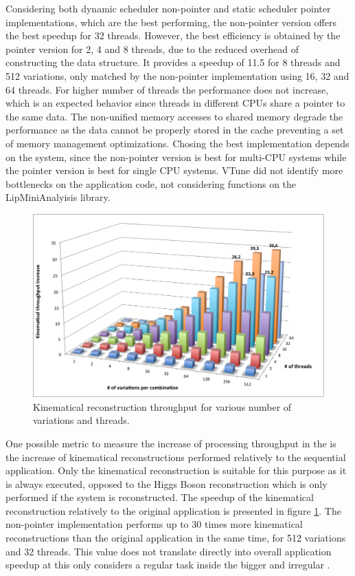 Considering both dynamic scheduler non-pointer and static scheduler pointer implementations, which are the best performing, the non-pointer version offers the best speedup for 32 threads. However, the best efficiency is obtained by the pointer version for 2, 4 and 8 threads, due to the reduced overhead of constructing the data structure. It provides a speedup of 11.5 for 8 threads and 512 variations, only matched by the non-pointer implementation using 16, 32 and 64 threads. For higher number of threads the performance does not increase, which is an expected behavior since threads in different CPUs share a pointer to the same data. The non-unified memory accesses to shared memory degrade the performance as the data cannot be properly stored in the cache preventing a set of memory management optimizations. Chosing the best implementation depends on the system, since the non-pointer version is best for multi-CPU systems while the pointer version is best for single CPU systems. VTune did not identify more bottlenecks on the application code, not considering functions on the LipMiniAnalyisis library.

\begin{figure}[!htp]
	\begin{center}
		\includegraphics[scale=0.6]{../../common/graphs/dilep_throughput.png}
		\caption{Kinematical reconstruction throughput for various number of variations and threads.}
		\label{fig:DilepThroughput}
	\end{center}
\end{figure}

One possible metric to measure the increase of processing throughput in the \ttDilepKinFit is the increase of kinematical reconstructions performed relatively to the sequential application. Only the kinematical reconstruction is suitable for this purpose as it is always executed, opposed to the Higgs Boson reconstruction which is only performed if the \ttbar system is reconstructed. The speedup of the kinematical reconstruction relatively to the original application is presented in figure \ref{fig:DilepThroughput}. The non-pointer implementation performs up to 30 times more kinematical reconstructions than the original application in the same time, for 512 variations and 32 threads. This value does not translate directly into overall application speedup at this only considers a regular task inside the bigger and irregular \ttDilepKinFit.

